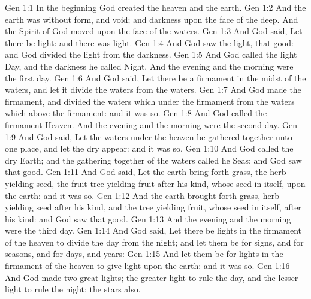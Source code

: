 \vs Gen 1:1 In the beginning God created the heaven and the earth.
\vs Gen 1:2 And the earth was without form, and void; and darkness  upon the face of the deep. And the Spirit of God moved upon the face of the waters.
\vs Gen 1:3 And God said, Let there be light: and there was light.
\vs Gen 1:4 And God saw the light, that  good: and God divided the light from the darkness.
\vs Gen 1:5 And God called the light Day, and the darkness he called Night. And the evening and the morning were the first day.
\vs Gen 1:6 And God said, Let there be a firmament in the midst of the waters, and let it divide the waters from the waters.
\vs Gen 1:7 And God made the firmament, and divided the waters which  under the firmament from the waters which  above the firmament: and it was so.
\vs Gen 1:8 And God called the firmament Heaven. And the evening and the morning were the second day.
\vs Gen 1:9 And God said, Let the waters under the heaven be gathered together unto one place, and let the dry  appear: and it was so.
\vs Gen 1:10 And God called the dry  Earth; and the gathering together of the waters called he Seas: and God saw that  good.
\vs Gen 1:11 And God said, Let the earth bring forth grass, the herb yielding seed,  the fruit tree yielding fruit after his kind, whose seed  in itself, upon the earth: and it was so.
\vs Gen 1:12 And the earth brought forth grass,  herb yielding seed after his kind, and the tree yielding fruit, whose seed  in itself, after his kind: and God saw that  good.
\vs Gen 1:13 And the evening and the morning were the third day.
\vs Gen 1:14 And God said, Let there be lights in the firmament of the heaven to divide the day from the night; and let them be for signs, and for seasons, and for days, and years:
\vs Gen 1:15 And let them be for lights in the firmament of the heaven to give light upon the earth: and it was so.
\vs Gen 1:16 And God made two great lights; the greater light to rule the day, and the lesser light to rule the night:  the stars also.

